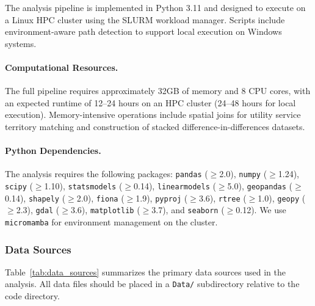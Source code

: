 \documentclass[sigconf]{acmart}
\begin{document}
The analysis pipeline is implemented in Python 3.11 and designed to execute on a Linux HPC cluster using the SLURM workload manager. Scripts include environment-aware path detection to support local execution on Windows systems.

\paragraph{Computational Resources.} The full pipeline requires approximately 32GB of memory and 8 CPU cores, with an expected runtime of 12--24 hours on an HPC cluster (24--48 hours for local execution). Memory-intensive operations include spatial joins for utility service territory matching and construction of stacked difference-in-differences datasets.

\paragraph{Python Dependencies.} The analysis requires the following packages: \texttt{pandas} ($\geq$2.0), \texttt{numpy} ($\geq$1.24), \texttt{scipy} ($\geq$1.10), \texttt{statsmodels} ($\geq$0.14), \texttt{linearmodels} ($\geq$5.0), \texttt{geopandas} ($\geq$0.14), \texttt{shapely} ($\geq$2.0), \texttt{fiona} ($\geq$1.9), \texttt{pyproj} ($\geq$3.6), \texttt{rtree} ($\geq$1.0), \texttt{geopy} ($\geq$2.3), \texttt{gdal} ($\geq$3.6), \texttt{matplotlib} ($\geq$3.7), and \texttt{seaborn} ($\geq$0.12). We use \texttt{micromamba} for environment management on the cluster.

\subsubsection{Data Sources}
\label{appendix:data}

Table~\ref{tab:data_sources} summarizes the primary data sources used in the analysis. All data files should be placed in a \texttt{Data/} subdirectory relative to the code directory.
\end{document}
